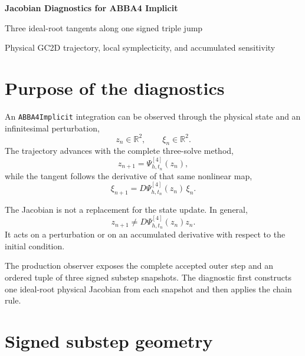 \documentclass[11pt,a4paper]{article}
\newcommand{\R}{\mathbb{R}}
\begin{document}
\begin{center}
\end{center}


\begin{center}
  {\LARGE\bfseries\color{blue}Jacobian Diagnostics for ABBA4 Implicit}\par
  \vspace{0.35em}
  {\large Three ideal-root tangents along one signed triple jump}\par
  \vspace{0.45em}
  {\small Physical GC2D trajectory, local symplecticity, and accumulated sensitivity}
\end{center}

\vspace{0.5em}

\section{Purpose of the diagnostics}

An \texttt{ABBA4Implicit} integration can be observed through the physical
state and an infinitesimal perturbation,
\[
 z_n\in\R^2,
 \qquad
 \xi_n\in\R^2.
\]
The trajectory advances with the complete three-solve method,
\[
 z_{n+1}=\Psi^{[4]}_{h,t_n}(z_n),
\]
while the tangent follows the derivative of that same nonlinear map,
\[
 \boxed{
 \xi_{n+1}=D\Psi^{[4]}_{h,t_n}(z_n)\,\xi_n.
 }
\]

The Jacobian is not a replacement for the state update.  In general,
\[
 z_{n+1}\neq D\Psi^{[4]}_{h,t_n}(z_n)z_n.
\]
It acts on a perturbation or on an accumulated derivative with respect to the
initial condition.

The production observer exposes the complete accepted outer step and an
ordered tuple of three signed substep snapshots.  The diagnostic first
constructs one ideal-root physical Jacobian from each snapshot and then applies
the chain rule.

\section{Signed substep geometry}
\end{document}
